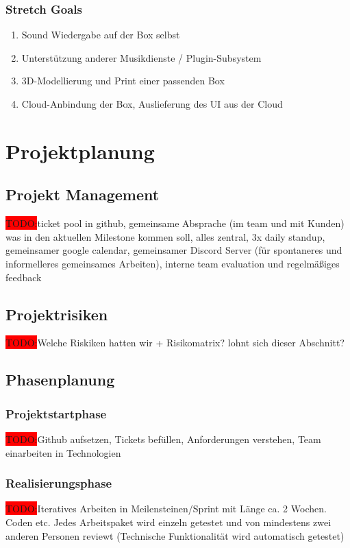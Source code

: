 \documentclass[10pt, a4paper, draft]{article}
\begin{document}
\subsubsection{Stretch Goals}
\begin{enumerate}
  \item Sound Wiedergabe auf der Box selbst
  \item Unterstützung anderer Musikdienste / Plugin-Subsystem
  \item 3D-Modellierung und Print einer passenden Box
  \item Cloud-Anbindung der Box, Auslieferung des UI aus der Cloud
\end{enumerate}

\section{Projektplanung}

\subsection{Projekt Management}
\colorbox{red}{TODO:}ticket pool in github, gemeinsame Absprache (im team und mit Kunden) was in den aktuellen Milestone kommen soll, alles zentral, 3x daily standup, gemeinsamer google calendar, gemeinsamer Discord Server (für spontaneres und informelleres gemeinsames Arbeiten), interne team evaluation und regelmäßiges feedback

\subsection{Projektrisiken}
\colorbox{red}{TODO:}Welche Riskiken hatten wir + Risikomatrix? lohnt sich dieser Abschnitt?

\subsection{Phasenplanung}
\subsubsection{Projektstartphase}
\colorbox{red}{TODO:}Github aufsetzen, Tickets befüllen, Anforderungen verstehen, Team einarbeiten in Technologien

\subsubsection{Realisierungsphase}
\colorbox{red}{TODO:}Iteratives Arbeiten in Meilensteinen/Sprint mit Länge ca. 2 Wochen. Coden etc. Jedes Arbeitspaket wird einzeln getestet und von mindestens zwei anderen Personen reviewt (Technische Funktionalität wird automatisch getestet)
\end{document}
